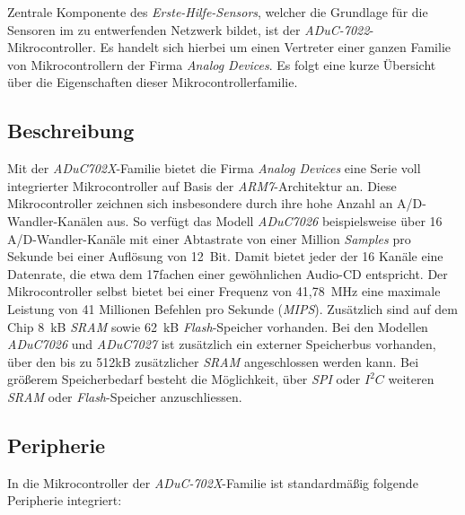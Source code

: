                            

    Zentrale Komponente des \emph{Erste-Hilfe-Sensors}, welcher die Grundlage für die Sensoren im zu entwerfenden Netzwerk
    bildet, ist der \emph{ADuC-7022}-Mikrocontroller. Es handelt sich hierbei um einen Vertreter einer ganzen Familie
    von Mikrocontrollern der Firma \emph{Analog Devices}. Es folgt eine kurze Übersicht über die Eigenschaften
    dieser Mikrocontrollerfamilie.

    \subsection{Beschreibung}
        Mit der \emph{ADuC702X}-Familie bietet die Firma \emph{Analog Devices} eine Serie voll integrierter 
        Mikrocontroller auf Basis der \emph{ARM7}-Architektur an. Diese Mikrocontroller zeichnen sich insbesondere 
        durch ihre hohe Anzahl an A/D-Wandler-Kanälen aus. So verfügt das Modell \emph{ADuC7026} beispielsweise
        über 16 A/D-Wandler-Kanäle mit einer Abtastrate von einer Million \emph{Samples} pro Sekunde bei einer 
        Auflösung von 12~Bit. Damit bietet jeder der 16 Kanäle eine Datenrate, die etwa dem 17fachen einer 
        gewöhnlichen Audio-CD entspricht.  Der Mikrocontroller selbst bietet bei einer Frequenz von 
        41,78~MHz eine maximale Leistung von 41 Millionen Befehlen pro Sekunde (\emph{MIPS}). 
        Zusätzlich sind auf dem Chip 8~kB \emph{SRAM} sowie 62~kB \emph{Flash}-Speicher vorhanden. Bei den Modellen
        \emph{ADuC7026} und \emph{ADuC7027} ist zusätzlich ein externer Speicherbus vorhanden, über den bis zu 512kB 
        zusätzlicher \emph{SRAM} angeschlossen werden kann. Bei größerem Speicherbedarf besteht die Möglichkeit, über 
        \emph{SPI} oder \emph{$I^2C$} weiteren \emph{SRAM} oder \emph{Flash}-Speicher anzuschliessen. \cite{aduc_datasheet}

    \subsection{Peripherie}
        In die Mikrocontroller der \emph{ADuC-702X}-Familie ist standardmäßig folgende Peripherie integriert:

